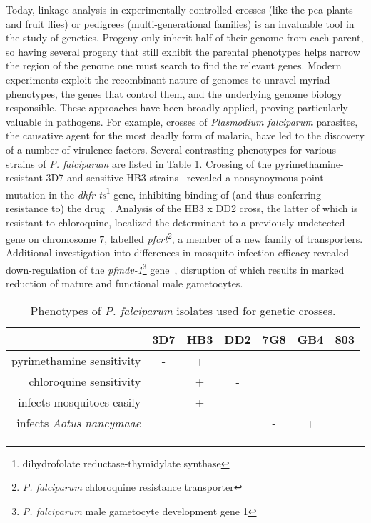Today, linkage analysis in experimentally controlled crosses (like the pea plants and fruit flies) or pedigrees (multi-generational families) is an invaluable tool in the study of genetics.  Progeny only inherit half of their genome from each parent, so having several progeny that still exhibit the parental phenotypes helps narrow the region of the genome one must search to find the relevant genes.  Modern experiments exploit the recombinant nature of genomes to unravel myriad phenotypes, the genes that control them, and the underlying genome biology responsible.  These approaches have been broadly applied, proving particularly valuable in pathogens.  For example, crosses of \textit{Plasmodium falciparum} parasites, the causative agent for the most deadly form of malaria, have led to the discovery of a number of virulence factors.  Several contrasting phenotypes for various strains of \textit{P. falciparum} are listed in Table \ref{tb:pf_phenotypes}.  Crossing of the pyrimethamine-resistant 3D7 and sensitive HB3 strains~\cite{Walliker:1987cv} revealed a nonsynoymous point mutation in the \textit{dhfr-ts}\footnote{dihydrofolate reductase-thymidylate synthase} gene, inhibiting binding of (and thus conferring resistance to) the drug~\cite{Peterson:1988wt}.  Analysis of the HB3 x DD2 cross\cite{Wellems:1990eg}, the latter of which is resistant to chloroquine, localized the determinant to a previously undetected gene on chromosome $7$, labelled \textit{pfcrt}\footnote{\textit{P. falciparum} chloroquine resistance transporter}, a member of a new family of transporters.  Additional investigation into differences in mosquito infection efficacy revealed down-regulation of the \textit{pfmdv-1}\footnote{\textit{P. falciparum} male gametocyte development gene 1} gene~\cite{Vaidya:1995up,Furuya:2005jn}, disruption of which results in marked reduction of mature and functional male gametocytes.

\begin{table}[]
\centering
\caption{Phenotypes of \textit{P. falciparum} isolates used for genetic crosses.}
\label{tb:pf_phenotypes}
\begin{tabular}{@{}rcccccc@{}}
\toprule
                                 & 3D7 & HB3 & DD2 & 7G8 & GB4 & 803 \\
\midrule
pyrimethamine sensitivity        & -   & +   &     &     &     &     \\
chloroquine sensitivity          &     & +   & -   &     &     &     \\
infects mosquitoes easily        &     & +   & -   &     &     &     \\
infects \textit{Aotus nancymaae} &     &     &     & -   & +   &     \\
\bottomrule
\end{tabular}
\end{table}

